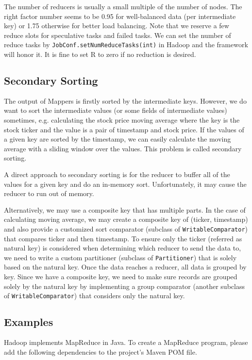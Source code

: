 \documentclass[12pt]{book}
\begin{document}
The number of reducers is usually a small multiple of the number of nodes. The right factor number seems to be 0.95 for well-balanced data (per intermediate key) or 1.75 otherwise for better load balancing. Note that we reserve a few reduce slots for speculative tasks and failed tasks. We can set the number of reduce tasks by \texttt{JobConf.setNumReduceTasks(int)} in Hadoop and the framework will honor it. It is fine to set R to zero if no reduction is desired.

\subsection{Secondary Sorting}
The output of Mappers is firstly sorted by the intermediate keys. However, we do want to sort the intermediate values (or some fields of intermediate values) sometimes, e.g. calculating the stock price moving average where the key is the stock ticker and the value is a pair of timestamp and stock price. If the values of a given key are sorted by the timestamp, we can easily calculate the moving average with a sliding window over the values. This problem is called secondary sorting.

A direct approach to secondary sorting is for the reducer to buffer all of the values for a given key and do an in-memory sort. Unfortunately, it may cause the reducer to run out of memory.

Alternatively, we may use a composite key that has multiple parts. In the case of calculating moving average, we may create a composite key of (ticker, timestamp) and also provide a customized sort comparator (subclass of \texttt{WritableComparator}) that compares ticker and then timestamp.
To ensure only the ticker (referred as natural key) is considered when determining which reducer to send the data to, we need to write a custom partitioner (subclass of \texttt{Partitioner}) that is solely based on the natural key.
Once the data reaches a reducer, all data is grouped by key. Since we have a composite key, we need to make sure records are grouped solely by the natural key by implementing a group comparator (another subclass of \texttt{WritableComparator}) that considers only the natural key.

\subsection{Examples}
Hadoop implements MapReduce in Java. To create a MapReduce program, please add the following dependencies to the project's Maven POM file.
\end{document}
